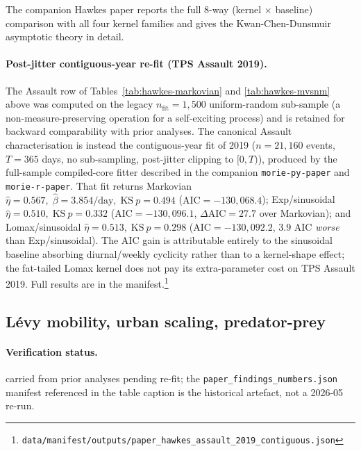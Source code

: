\documentclass[article,shortnames,nojss]{jss}
\begin{document}
The companion Hawkes paper \citep{Ruhela2026Hawkes} reports the full 8-way
(kernel $\times$ baseline) comparison with all four kernel families
and gives the Kwan-Chen-Dunsmuir asymptotic theory in detail.

\paragraph{Post-jitter contiguous-year re-fit (TPS Assault 2019).}
The Assault row of Tables~\ref{tab:hawkes-markovian} and
\ref{tab:hawkes-mvsnm} above was computed on the legacy
$n_{\text{fit}}=1{,}500$ uniform-random sub-sample (a
non-measure-preserving operation for a self-exciting process)
and is retained for backward comparability with prior
analyses.  The canonical Assault characterisation is instead the
contiguous-year fit of 2019 ($n=21{,}160$ events,
$T=365$ days, no sub-sampling, post-jitter clipping to $[0,T)$),
produced by the full-sample compiled-core fitter described in the
companion \texttt{morie-py-paper} and \texttt{morie-r-paper}.
That fit returns Markovian
$\hat\eta=0.567,\;\hat\beta=3.854/\text{day},\;\text{KS}~p=0.494$
($\text{AIC}=-130{,}068.4$); Exp/sinusoidal
$\hat\eta=0.510,\;\text{KS}~p=0.332$
($\text{AIC}=-130{,}096.1$, $\Delta\text{AIC}=27.7$ over
Markovian); and Lomax/sinusoidal $\hat\eta=0.513,\;\text{KS}~p=0.298$
($\text{AIC}=-130{,}092.2$, $3.9$ AIC \emph{worse} than
Exp/sinusoidal).  The AIC gain is attributable entirely to the
sinusoidal baseline absorbing diurnal/weekly cyclicity rather
than to a kernel-shape effect; the fat-tailed Lomax kernel does
not pay its extra-parameter cost on TPS Assault 2019.  Full results are
in the manifest.\footnote{\texttt{data/manifest/outputs/paper\_hawkes\_assault\_2019\_contiguous.json}}

\subsection{Lévy mobility, urban scaling, predator-prey}\label{phys-scaling}


\paragraph*{Verification status.}
carried from prior analyses pending re-fit; the \texttt{paper\_findings\_numbers.json} manifest referenced in the table caption is the historical artefact, not a 2026-05 re-run.
\end{document}
